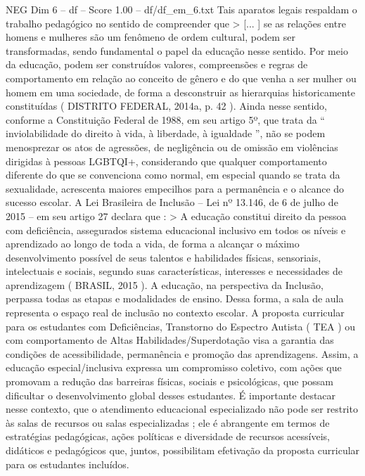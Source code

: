 \begin{textsample}{NEG Dim 6 – df – Score 1.00 – df/df\_em\_6.txt}
Tais aparatos legais respaldam o trabalho pedagógico no sentido de compreender que > [... ] se as relações entre homens e mulheres são um fenômeno de ordem cultural, podem ser transformadas, sendo fundamental o papel da educação nesse sentido.
Por meio da educação, podem ser construídos valores, compreensões e regras de comportamento em relação ao conceito de gênero e do que venha a ser mulher ou homem em uma sociedade, de forma a desconstruir as hierarquias historicamente constituídas ( DISTRITO FEDERAL, 2014a, p. 42 ).
Ainda nesse sentido, conforme a Constituição Federal de 1988, em seu artigo 5º, que trata da “ inviolabilidade do direito à vida, à liberdade, à igualdade ”, não se podem menosprezar os atos de agressões, de negligência ou de omissão em violências dirigidas à pessoas LGBTQI+, considerando que qualquer comportamento diferente do que se convenciona como normal, em especial quando se trata da sexualidade, acrescenta maiores empecilhos para a permanência e o alcance do sucesso escolar.
A Lei Brasileira de Inclusão – Lei nº 13.146, de 6 de julho de 2015 – em seu artigo 27 declara que : > A educação constitui direito da pessoa com deficiência, assegurados sistema educacional inclusivo em todos os níveis e aprendizado ao longo de toda a vida, de forma a alcançar o máximo desenvolvimento possível de seus talentos e habilidades físicas, sensoriais, intelectuais e sociais, segundo suas características, interesses e necessidades de aprendizagem ( BRASIL, 2015 ).
A educação, na perspectiva da Inclusão, perpassa todas as etapas e modalidades de ensino.
Dessa forma, a sala de aula representa o espaço real de inclusão no contexto escolar.
A proposta curricular para os estudantes com Deficiências, Transtorno do Espectro Autista ( TEA ) ou com comportamento de Altas Habilidades/Superdotação visa a garantia das condições de acessibilidade, permanência e promoção das aprendizagens.
Assim, a educação especial/inclusiva expressa um compromisso coletivo, com ações que promovam a redução das barreiras físicas, sociais e psicológicas, que possam dificultar o desenvolvimento global desses estudantes.
É importante destacar nesse contexto, que o atendimento educacional especializado não pode ser restrito às salas de recursos ou salas especializadas ; ele é abrangente em termos de estratégias pedagógicas, ações políticas e diversidade de recursos acessíveis, didáticos e pedagógicos que, juntos, possibilitam efetivação da proposta curricular para os estudantes incluídos.

\end{textsample}
